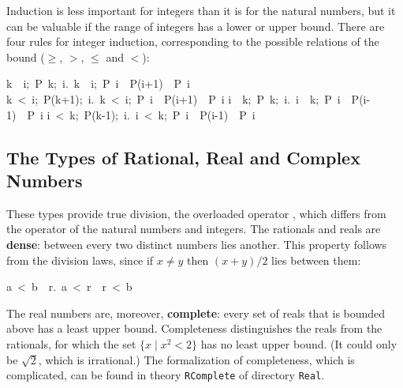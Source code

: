 Induction is less important for integers than it is for the natural numbers, but it can be valuable if the range of integers has a lower or upper bound.  There are four rules for integer induction, corresponding to the possible relations of the bound ($\geq$, $>$, $\leq$ and $<$):
\begin{isabelle}
\isasymlbrakk k\ \isasymle \ i;\ P\ k;\ \isasymAnd i.\ \isasymlbrakk k\ \isasymle \ i;\ P\ i\isasymrbrakk \ \isasymLongrightarrow \ P(i+1)\isasymrbrakk \ \isasymLongrightarrow \ P\ i%
\isanewline
\isasymlbrakk k\ <\ i;\ P(k+1);\ \isasymAnd i.\ \isasymlbrakk k\ <\ i;\ P\ i\isasymrbrakk \ \isasymLongrightarrow \ P(i+1)\isasymrbrakk \ \isasymLongrightarrow \ P\ i%
\isanewline
\isasymlbrakk i\ \isasymle \ k;\ P\ k;\ \isasymAnd i.\ \isasymlbrakk i\ \isasymle \ k;\ P\ i\isasymrbrakk \ \isasymLongrightarrow \ P(i-1)\isasymrbrakk \ \isasymLongrightarrow \ P\ i%
\isanewline
\isasymlbrakk i\ <\ k;\ P(k-1);\ \isasymAnd i.\ \isasymlbrakk i\ <\ k;\ P\ i\isasymrbrakk \ \isasymLongrightarrow \ P(i-1)\isasymrbrakk \ \isasymLongrightarrow \ P\ i%
\end{isabelle}


\subsection{The Types of Rational, Real and Complex Numbers}
\label{sec:real}

%
%
%
These types provide true division, the overloaded operator \isa{/}, 
which differs from the operator  of the 
natural numbers and integers. The rationals and reals are 
\textbf{dense}: between every two distinct numbers lies another.
This property follows from the division laws, since if $x\not=y$ then $(x+y)/2$ lies between them:
\begin{isabelle}
a\ <\ b\ \isasymLongrightarrow \ \isasymexists r.\ a\ <\ r\ \isasymand \ r\ <\ b%
\end{isabelle}

The real numbers are, moreover, \textbf{complete}: every set of reals that
is bounded above has a least upper bound.  Completeness distinguishes the
reals from the rationals, for which the set $\{x\mid x^2<2\}$ has no least
upper bound.  (It could only be $\surd2$, which is irrational.) The
formalization of completeness, which is complicated, 
can be found in theory \texttt{RComplete} of directory
\texttt{Real}.

